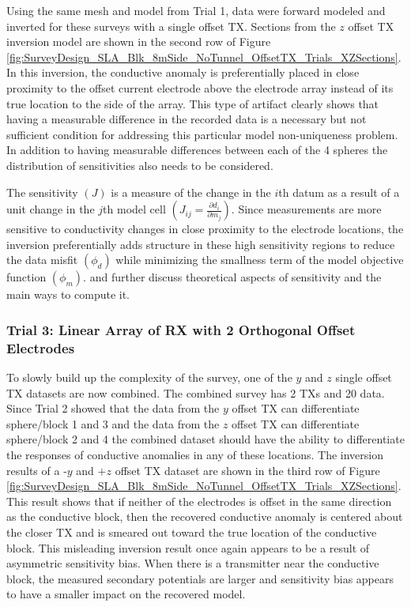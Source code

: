 \documentclass[preprint,authoryear,12pt]{elsarticle}
\begin{document}
Using the same mesh and model from Trial 1, data were forward modeled and inverted for these surveys with a single offset TX. Sections from the $z$ offset TX inversion model are shown in the second row of Figure \ref{fig:SurveyDesign_SLA_Blk_8mSide_NoTunnel_OffsetTX_Trials_XZSections}. In this inversion, the conductive anomaly is preferentially placed in close proximity to the offset current electrode above the electrode array instead of its true location to the side of the array. This type of artifact clearly shows that having a measurable difference in the recorded data is a necessary but not sufficient condition for addressing this particular model non-uniqueness problem. In addition to having measurable differences between each of the 4 spheres the distribution of sensitivities also needs to be considered.

The sensitivity $\left( J \right)$ is a measure of the change in the $i$th datum as a result of a unit change in the $j$th model cell $\left( J_{ij} = \frac{\partial d_i}{\partial m_j} \right)$. Since measurements are more sensitive to conductivity changes in close proximity to the electrode locations, the inversion preferentially adds structure in these high sensitivity regions to reduce the data misfit $\left( \phi_d \right)$ while minimizing the smallness term of the model objective function $\left( \phi_m \right)$. \citet{McGILLIVRAY1990} and \citet{Spitzer1998} further discuss theoretical aspects of sensitivity and the main ways to compute it.


\subsubsection{Trial 3: Linear Array of RX with 2 Orthogonal Offset Electrodes}
\label{sec:TheoreticalAnalysis_Trial3_2OrthogElecOffset}

To slowly build up the complexity of the survey, one of the $y$ and $z$ single offset TX datasets are now combined. The combined survey has 2 TXs and 20 data. Since Trial 2 showed that the data from the $y$ offset TX can differentiate sphere/block 1 and 3 and the data from the $z$ offset TX can differentiate sphere/block 2 and 4 the combined dataset should have the ability to differentiate the responses of conductive anomalies in any of these locations. The inversion results of a -$y$ and $+z$ offset TX dataset are shown in the third row of Figure \ref{fig:SurveyDesign_SLA_Blk_8mSide_NoTunnel_OffsetTX_Trials_XZSections}. This result shows that if neither of the electrodes is offset in the same direction as the conductive block, then the recovered conductive anomaly is centered about the closer TX and is smeared out toward the true location of the conductive block. This misleading inversion result once again appears to be a result of asymmetric sensitivity bias. When there is a transmitter near the conductive block, the measured secondary potentials are larger and sensitivity bias appears to have a smaller impact on the recovered model.
\end{document}
